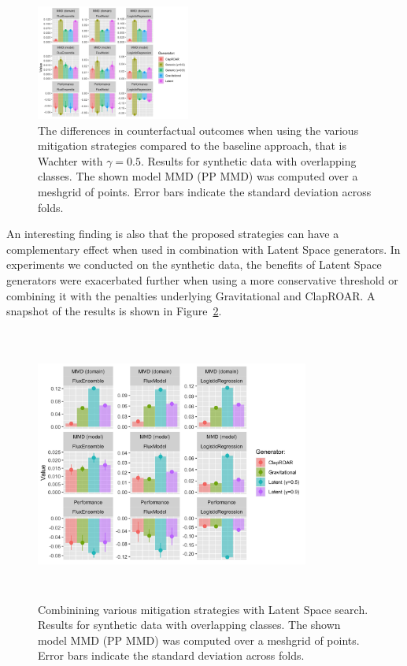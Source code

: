 \documentclass[
  conference]{IEEEtran}
\begin{document}
\begin{figure}

{\centering \includegraphics[width=0.45\textwidth,height=\textheight]{www/mitigation_synthetic_results.png}

}

\caption{\label{fig-mitigate-results}The differences in counterfactual
outcomes when using the various mitigation strategies compared to the
baseline approach, that is Wachter with \(\gamma=0.5\). Results for
synthetic data with overlapping classes. The shown model MMD (PP MMD)
was computed over a meshgrid of points. Error bars indicate the standard
deviation across folds.}

\end{figure}

An interesting finding is also that the proposed strategies can have a
complementary effect when used in combination with Latent Space
generators. In experiments we conducted on the synthetic data, the
benefits of Latent Space generators were exacerbated further when using
a more conservative threshold or combining it with the penalties
underlying Gravitational and ClapROAR. A snapshot of the results is
shown in Figure~\ref{fig-mitigate-latent-results}.

\begin{figure}

{\centering \includegraphics[width=9cm,height=9cm]{www/mitigation_synthetic_latent_results.png}

}

\caption{\label{fig-mitigate-latent-results}Combinining various
mitigation strategies with Latent Space search. Results for synthetic
data with overlapping classes. The shown model MMD (PP MMD) was computed
over a meshgrid of points. Error bars indicate the standard deviation
across folds.}

\end{figure}
\end{document}
